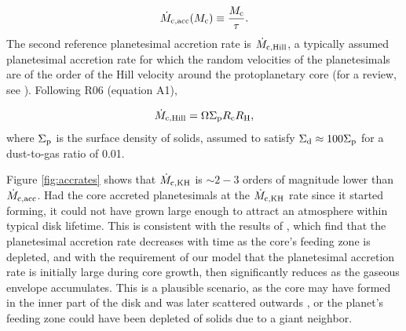 \documentclass[apj]{emulateapj}
\newcommand{\co}{_{\rm c}}
\newcommand{\di}{_{\rm d}}
\begin{document}
\begin{equation}
\label{eq:Mcdot}
\dot{M}_{\rm{c,acc}}(M_{\rm{c}}) \equiv \frac{M_{\rm{c}}}{\tau}.
\end{equation}
The second reference planetesimal accretion rate is $\dot{M}_{\rm c, Hill}$, a typically assumed planetesimal accretion rate for which the random velocities of the planetesimals are of the order of the Hill velocity around the protoplanetary core (for a review, see \citealt{goldreich04}). Following R06 (equation A1),


\begin{equation}
\label{eq:MdotHill}
\dot{M}_{\rm{c,Hill}}=\Omega \Sigma_{\rm p} R\co R_{\rm H},
\end{equation}
where $\Sigma_{\rm p}$ is the surface density of solids, assumed to satisfy $\Sigma\di \approx 100 \Sigma_{\rm p}$ for a dust-to-gas ratio of 0.01.

Figure \ref{fig:accrates} shows that $\dot{M}_{\rm c,KH}$ is $\sim2-3$ orders of magnitude lower than $\dot{M}_{\rm c, acc}$. Had the core accreted planetesimals at the $\dot{M}_{\rm c, KH}$ rate since it started forming, it could not have grown large enough to attract an atmosphere within typical disk lifetime. This is consistent with the results of \citet{pollack96}, which find that the planetesimal accretion rate decreases with time as the core's feeding zone is depleted, and with the requirement of our model that the planetesimal accretion rate is initially large during core growth, then significantly reduces as the gaseous envelope accumulates. This is a plausible scenario, as the core may have formed in the inner part of the disk and was later scattered outwards \citep{ida13}, or the planet's feeding zone could have been depleted of solids due to a giant neighbor.  
\end{document}
